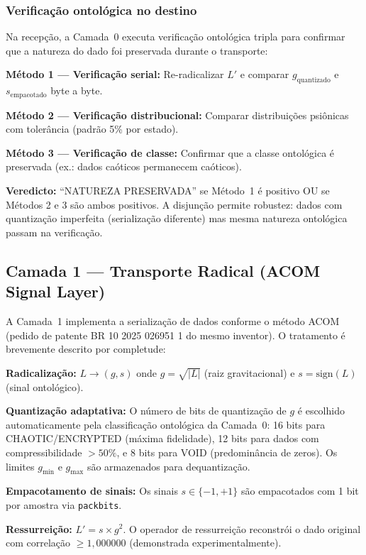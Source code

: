 \documentclass[12pt,a4paper]{article}
\begin{document}
\subsubsection{Verificação ontológica no destino}

Na recepção, a Camada~0 executa verificação ontológica tripla
para confirmar que a natureza do dado foi preservada durante o
transporte:

\textbf{Método 1 --- Verificação serial:} Re-radicalizar
$L'$ e comparar $g_{\text{quantizado}}$ e $s_{\text{empacotado}}$
byte a byte.

\textbf{Método 2 --- Verificação distribucional:} Comparar
distribuições psiônicas com tolerância (padrão 5\% por estado).

\textbf{Método 3 --- Verificação de classe:} Confirmar que a
classe ontológica é preservada (ex.: dados caóticos permanecem
caóticos).

\textbf{Veredicto:} ``NATUREZA PRESERVADA'' se Método~1 é
positivo OU se Métodos 2 e 3 são ambos positivos. A
disjunção permite robustez: dados com quantização imperfeita
(serialização diferente) mas mesma natureza ontológica passam
na verificação.

\subsection{Camada 1 --- Transporte Radical (ACOM Signal Layer)}

A Camada~1 implementa a serialização de dados conforme o método
ACOM (pedido de patente BR 10 2025 026951 1 do mesmo inventor).
O tratamento é brevemente descrito por completude:

\textbf{Radicalização:} $L \to (g, s)$ onde $g = \sqrt{|L|}$
(raiz gravitacional) e $s = \text{sign}(L)$ (sinal ontológico).

\textbf{Quantização adaptativa:} O número de bits de
quantização de $g$ é escolhido automaticamente pela
classificação ontológica da Camada~0: 16 bits para
CHAOTIC/ENCRYPTED (máxima fidelidade), 12 bits para dados
com compressibilidade $> 50\%$, e 8 bits para VOID
(predominância de zeros). Os limites $g_{\min}$ e $g_{\max}$
são armazenados para dequantização.

\textbf{Empacotamento de sinais:} Os sinais $s \in \{-1, +1\}$
são empacotados com 1 bit por amostra via \texttt{packbits}.

\textbf{Ressurreição:} $L' = s \times g^2$. O operador de
ressurreição reconstrói o dado original com correlação
$\geq 1{,}000000$ (demonstrada experimentalmente).
\end{document}
